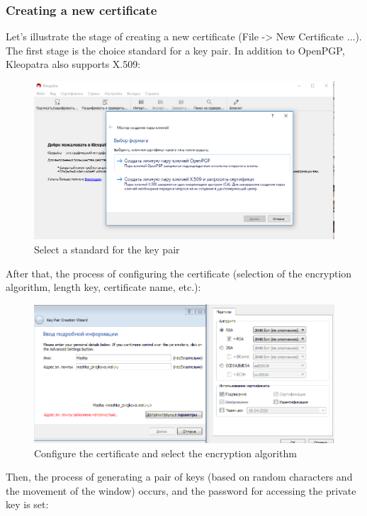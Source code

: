 \documentclass[14pt,a4paper,report]{report}
\begin{document}
\subsubsection{Creating a new certificate}

Let's illustrate the stage of creating a new certificate (File -> New Certificate ...). The first stage is the choice standard for a key pair. In addition to OpenPGP, Kleopatra also supports X.509:

\begin{figure}[h!]
	\centering
	\includegraphics[scale = 0.65]{images/1_1.png}
	\caption{Select a standard for the key pair}
\end{figure}

After that, the process of configuring the certificate (selection of the encryption algorithm, length key, certificate name, etc.):

\begin{figure}[h!]
	\centering
	\includegraphics[scale = 0.65]{images/1_2.png}
	\caption{Configure the certificate and select the encryption algorithm}
\end{figure}
\newpage
Then, the process of generating a pair of keys (based on random characters and the movement of the window) occurs, and the password for accessing the private key is set:
\end{document}
